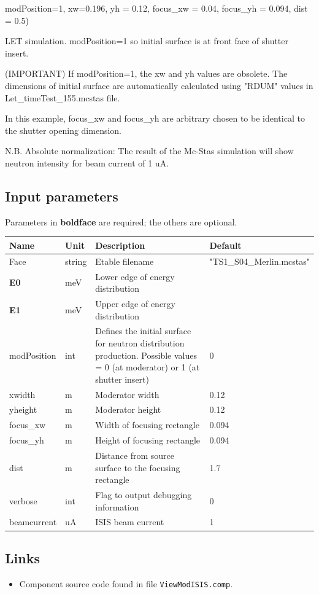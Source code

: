 modPosition=1, xw=0.196, yh = 0.12, focus\_xw = 0.04, focus\_yh = 0.094, dist = 0.5)

LET simulation. modPosition=1 so initial surface is at front face of shutter insert.

(IMPORTANT) If modPosition=1, the xw and yh values are obsolete. The dimensions of initial surface are automatically calculated using "RDUM" values in Let\_timeTest\_155.mcstas file.

In this example, focus\_xw and focus\_yh are arbitrary chosen to be identical to the shutter opening dimension.

N.B. Absolute normalization: The result of the Mc-Stas simulation will show neutron intensity for beam current of 1 uA.

\subsection*{Input parameters}
Parameters in \textbf{boldface} are required; the others are optional.

\begin{longtable}{p{}p{}p{}p{}}
\toprule
\textbf{Name} & \textbf{Unit} & \textbf{Description} & \textbf{Default} \\
\midrule
\endhead
Face & string & Etable filename & "TS1\_S04\_Merlin.mcstas" \\
\textbf{E0} & meV & Lower edge of energy distribution &  \\
\textbf{E1} & meV & Upper edge of energy distribution &  \\
modPosition & int & Defines the initial surface for neutron distribution production. Possible values = 0 (at moderator) or 1 (at shutter insert) & 0 \\
xwidth & m & Moderator width & 0.12 \\
yheight & m & Moderator height & 0.12 \\
focus\_xw & m & Width of focusing rectangle & 0.094 \\
focus\_yh & m & Height of focusing rectangle & 0.094 \\
dist & m & Distance from source surface to the focusing rectangle & 1.7 \\
verbose & int & Flag to output debugging information & 0 \\
beamcurrent & uA & ISIS beam current & 1 \\
\bottomrule
\end{longtable}

\subsection*{Links}
\begin{itemize}
  \item Component source code found in file \texttt{ViewModISIS.comp}.
\end{itemize}

